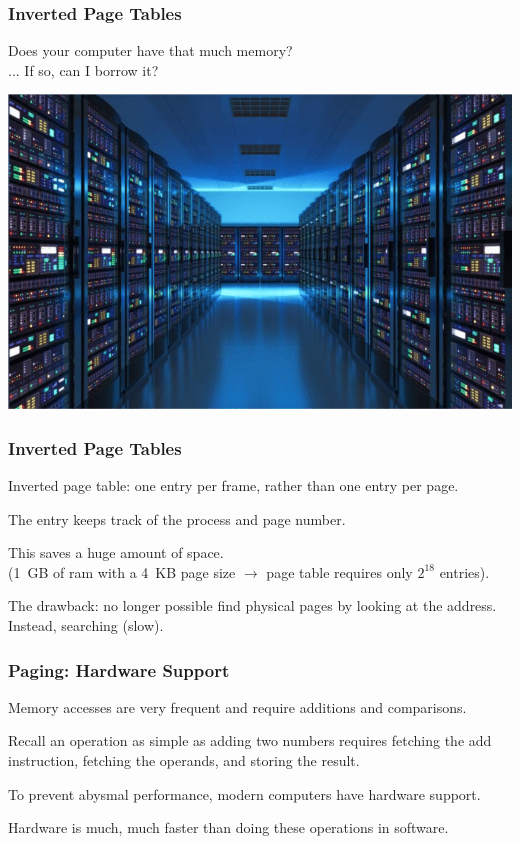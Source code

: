 \begin{frame}
\frametitle{Inverted Page Tables}

Does your computer have that much memory?\\
\quad ... If so, can I borrow it?

\begin{center}
	\includegraphics[width=\textwidth]{images/datacentre.png}
\end{center}



\end{frame}

\begin{frame}
\frametitle{Inverted Page Tables}

Inverted page table: one entry per frame, rather than one entry per page.

The entry keeps track of the process and page number. 

This saves a huge amount of space.\\
\quad (1~GB of ram with a 4~KB page size $\rightarrow$ page table requires only $2^{18}$ entries).

The drawback: no longer possible find physical pages by looking at the address.\\
\quad Instead, searching (slow).

\end{frame}

\begin{frame}
\frametitle{Paging: Hardware Support}

Memory accesses are very frequent and require additions and comparisons. 

Recall an operation as simple as adding two numbers requires fetching the add instruction, fetching the operands, and storing the result. 

To prevent abysmal performance, modern computers have hardware support.

Hardware is much, much faster than doing these operations in software.



\end{frame}

